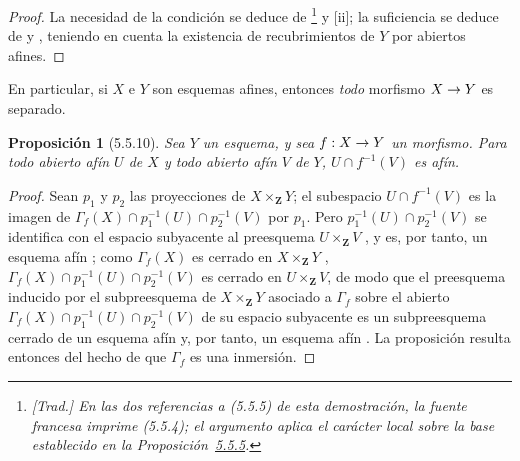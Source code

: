\documentclass[oneside]{amsart}
\theoremstyle{ega-env-style}
\theoremstyle{ega-thm-env-style}
\newtheorem*{proposition}{Proposición}
\theoremstyle{ega-defn-env-style}
\renewcommand{\to}{\mathchoice{\longrightarrow}{\rightarrow}{\rightarrow}{\rightarrow}}
\newcommand{\oldpage}[2][]{{\marginnote{\normalfont{\textbf{#1}~|~#2}}}\ignorespaces}
\let\EGAOriginalLabel\label
\renewcommand{\label}[1]{\phantomsection\EGAOriginalLabel{#1}}
\begin{document}
\begin{proof}
La necesidad de la condición se deduce de \footnote{\emph{[Trad.] En las dos referencias a (5.5.5) de esta demostración, la fuente francesa imprime (5.5.4); el argumento aplica el carácter local sobre la base establecido en la Proposición~\hyperref[I.5.5.5]{5.5.5}.}} y [ii];
la suficiencia se deduce de  y , teniendo en cuenta la existencia de recubrimientos de $Y$ por abiertos afines.
\end{proof}

En particular, si $X$ e $Y$ son esquemas afines, entonces \emph{todo} morfismo $X\to Y$ es separado.

\begin{proposition}[5.5.10]
\label{I.5.5.10}
Sea $Y$ un \emph{esquema}, y sea $f:X\to Y$ un morfismo.
Para todo abierto afín $U$ de $X$ y todo abierto afín $V$ de $Y$, $U\cap f^{-1}(V)$ es afín.
\end{proposition}

\begin{proof}
Sean $p_1$ y $p_2$ las proyecciones de $X\times_{\mathbf{Z}}Y$;
el subespacio $U\cap f^{-1}(V)$ es la imagen de $\Gamma_f(X)\cap p_1^{-1}(U)\cap p_2^{-1}(V)$ por $p_1$.
Pero $p_1^{-1}(U)\cap p_2^{-1}(V)$ se identifica con el espacio subyacente al
\oldpage[I]{139}
preesquema $U\times_{\mathbf{Z}}V$ , y es, por tanto, un esquema afín ;
como $\Gamma_f(X)$ es cerrado en $X\times_{\mathbf{Z}}Y$ , $\Gamma_f(X)\cap p_1^{-1}(U)\cap p_2^{-1}(V)$ es cerrado en $U\times_{\mathbf{Z}}V$, de modo que el preesquema inducido por el subpreesquema de $X\times_{\mathbf{Z}}Y$ asociado a $\Gamma_f$  sobre el abierto $\Gamma_f(X)\cap p_1^{-1}(U)\cap p_2^{-1}(V)$ de su espacio subyacente es un subpreesquema cerrado de un esquema afín y, por tanto, un esquema afín .
La proposición resulta entonces del hecho de que $\Gamma_f$ es una inmersión.
\end{proof}
\end{document}
